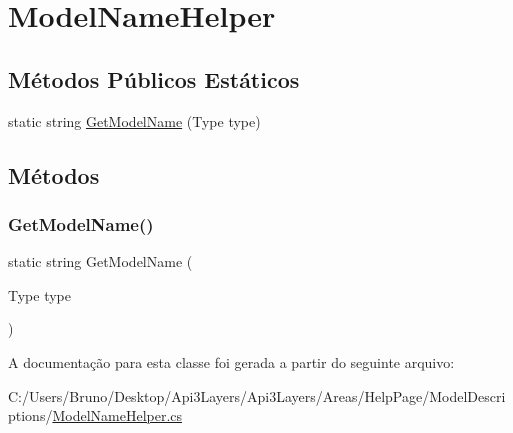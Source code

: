 \hypertarget{classApi3Layers_1_1Areas_1_1HelpPage_1_1ModelDescriptions_1_1ModelNameHelper}{}\section{Model\+Name\+Helper}
\label{classApi3Layers_1_1Areas_1_1HelpPage_1_1ModelDescriptions_1_1ModelNameHelper}
\subsection*{Métodos Públicos Estáticos}
\begin{DoxyCompactItemize}
\item 
static string \hyperlink{classApi3Layers_1_1Areas_1_1HelpPage_1_1ModelDescriptions_1_1ModelNameHelper_a94996770939db3fd96b3421ea1907cdb}{Get\+Model\+Name} (Type type)
\end{DoxyCompactItemize}


\subsection{Métodos}
\mbox{\label{classApi3Layers_1_1Areas_1_1HelpPage_1_1ModelDescriptions_1_1ModelNameHelper_a94996770939db3fd96b3421ea1907cdb}} 
\subsubsection{\texorpdfstring{Get\+Model\+Name()}{GetModelName()}}
{\footnotesize\ttfamily static string Get\+Model\+Name (\begin{DoxyParamCaption}\item[{Type}]{type }\end{DoxyParamCaption})\hspace{0.3cm}{\ttfamily [static]}}



A documentação para esta classe foi gerada a partir do seguinte arquivo\+:\begin{DoxyCompactItemize}
\item 
C\+:/\+Users/\+Bruno/\+Desktop/\+Api3\+Layers/\+Api3\+Layers/\+Areas/\+Help\+Page/\+Model\+Descriptions/\hyperlink{ModelNameHelper_8cs}{Model\+Name\+Helper.\+cs}\end{DoxyCompactItemize}

